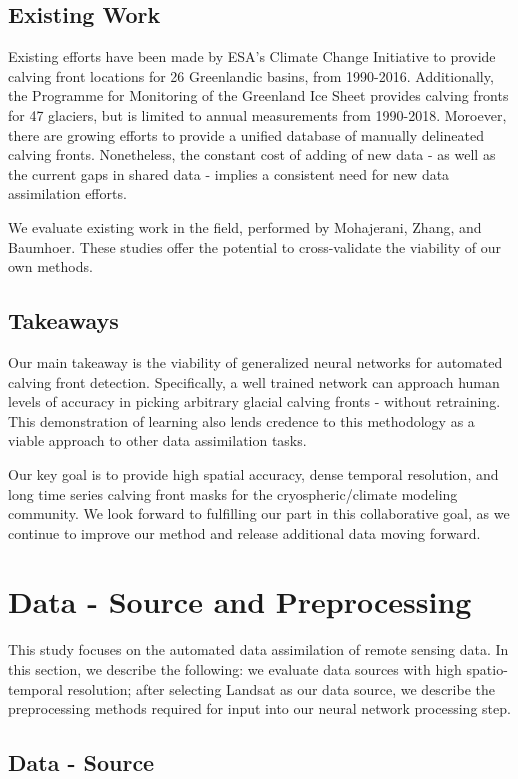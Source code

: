 \documentclass[tc, manuscript]{copernicus}
\begin{document}
\subsection{Existing Work}
Existing efforts have been made by ESA's Climate Change Initiative to provide calving front locations for 26 Greenlandic basins, from 1990-2016\citep{enveo2017}. Additionally, the Programme for Monitoring of the Greenland Ice Sheet provides calving fronts for 47 glaciers, but is limited to annual measurements from 1990-2018\citep{andersen2019}. Moroever, there are growing efforts to provide a unified database of manually delineated calving fronts. Nonetheless, the constant cost of adding of new data - as well as the current gaps in shared data - implies a consistent need for new data assimilation efforts.

We evaluate existing work in the field, performed by Mohajerani, Zhang, and Baumhoer. These studies offer the potential to cross-validate the viability of our own methods.

\subsection{Takeaways}
Our main takeaway is the viability of generalized neural networks for automated calving front detection. Specifically, a well trained network can approach human levels of accuracy in picking arbitrary glacial calving fronts - without retraining. This demonstration of learning also lends credence to this methodology as a viable approach to other data assimilation tasks.

Our key goal is to provide high spatial accuracy, dense temporal resolution, and long time series calving front masks for the cryospheric/climate modeling community. We look forward to fulfilling our part in this collaborative goal, as we continue to improve our method and release additional data moving forward.

\section{Data - Source and Preprocessing}
This study focuses on the automated data assimilation of remote sensing data. In this section, we describe the following: we evaluate data sources with high spatio-temporal resolution; after selecting Landsat as our data source, we describe the preprocessing methods required for input into our neural network processing step.

\subsection{Data - Source}
\end{document}
